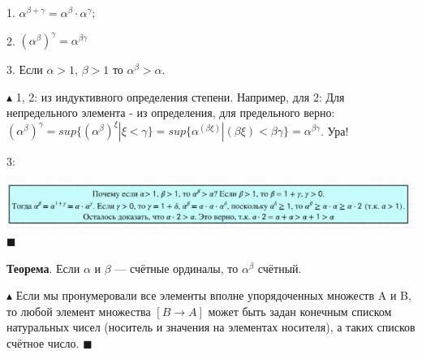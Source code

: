 1. $\alpha^{\beta + \gamma} = \alpha^{\beta} \cdot \alpha^{\gamma}$;

2. $(\alpha^{\beta})^{\gamma} = \alpha^{\beta \gamma}$

3. Если $\alpha > 1$, $\beta > 1$ то $\alpha^{\beta} > \alpha$.

$\blacktriangle$
1, 2: из индуктивного определения степени. Например, для 2: Для непредельного элемента - из определения, для предельного верно: $(\alpha^{\beta})^{\gamma} = sup\{(\alpha^{\beta})^{\xi} | \xi < \gamma \} = sup\{\alpha^{(\beta \xi)} | (\beta \xi) < \beta \gamma \} = \alpha^{\beta \gamma}$. Ура!

3:

\includegraphics[]{images/2.4_degree2}
$\blacksquare$

\textbf{Теорема}. Если $\alpha$ и $\beta$ — счётные ординалы, то $\alpha^{\beta}$
счётный.

$\blacktriangle$
Если мы пронумеровали все элементы вполне упорядоченных множеств A и B, то любой элемент множества $[B \rightarrow A]$ может быть задан конечным списком натуральных чисел (носитель и значения
на элементах носителя), а таких списков счётное число.
$\blacksquare$